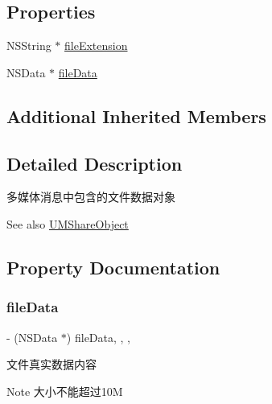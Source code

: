 \subsection*{Properties}
\begin{DoxyCompactItemize}
\item 
N\+S\+String $\ast$ \mbox{\hyperlink{interface_u_m_share_file_object_a8f5115814cbdad3f57d27b8d5e737b92}{file\+Extension}}
\item 
N\+S\+Data $\ast$ \mbox{\hyperlink{interface_u_m_share_file_object_ac0643a5bc4ff0b1ca54139dc9bfaa71e}{file\+Data}}
\end{DoxyCompactItemize}
\subsection*{Additional Inherited Members}


\subsection{Detailed Description}
多媒体消息中包含的文件数据对象 

\begin{DoxySeeAlso}{See also}
\mbox{\hyperlink{interface_u_m_share_object}{U\+M\+Share\+Object}} 
\end{DoxySeeAlso}


\subsection{Property Documentation}
\mbox{\label{interface_u_m_share_file_object_ac0643a5bc4ff0b1ca54139dc9bfaa71e}} 
\subsubsection{\texorpdfstring{file\+Data}{fileData}}
{\footnotesize\ttfamily -\/ (N\+S\+Data $\ast$) file\+Data\hspace{0.3cm}{\ttfamily [read]}, {\ttfamily [write]}, {\ttfamily [nonatomic]}, {\ttfamily [retain]}}

文件真实数据内容 \begin{DoxyNote}{Note}
大小不能超过10M 
\end{DoxyNote}
\mbox{\label{interface_u_m_share_file_object_a8f5115814cbdad3f57d27b8d5e737b92}} 

